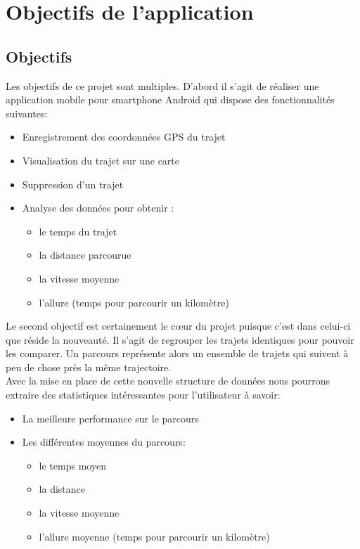 \chapter{Objectifs de l'application}
\section{Objectifs}
Les objectifs de ce projet sont multiples. D'abord il s'agit de réaliser une application mobile pour smartphone Android qui dispose des fonctionnalités suivantes:\\

\begin{itemize}
  \item Enregistrement des coordonnées GPS du trajet
  \item Visualisation du trajet sur une carte 
  \item Suppression d'un trajet 
  \item Analyse des données pour obtenir :
  \begin{itemize}
    \item le temps du trajet
    \item la distance parcourue
    \item la vitesse moyenne
    \item l'allure (temps pour parcourir un kilomètre)
  \end{itemize}
\end{itemize}

Le second objectif est certainement le cœur du projet puisque c'est dans celui-ci que réside la nouveauté. Il s'agit de regrouper les trajets identiques pour pouvoir les comparer. Un parcours représente alors un ensemble de trajets qui suivent à peu de chose près la même trajectoire.\\

Avec la mise en place de cette nouvelle structure de données nous pourrons extraire des statistiques intéressantes pour l'utilisateur à savoir:\\

\begin{itemize}
  \item La meilleure performance sur le parcours
  \item Les différentes moyennes du parcours:
  \begin{itemize}
    \item le temps moyen
    \item la distance
    \item la vitesse moyenne
    \item l'allure moyenne (temps pour parcourir un kilomètre)
  \end{itemize}   
\end{itemize}

